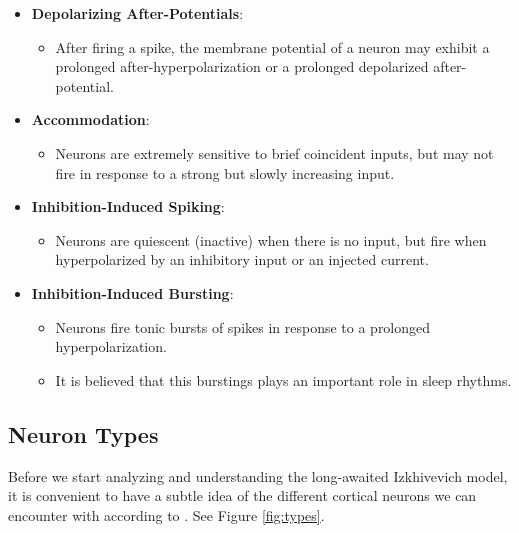 \documentclass{article} %
\begin{document}
\begin{itemize}
    \item \textbf{Depolarizing After-Potentials}:
    \begin{itemize}
        \item After firing a spike, the membrane potential of a neuron may exhibit a prolonged after-hyperpolarization or a prolonged depolarized after-potential.
    \end{itemize}
    
    \item \textbf{Accommodation}:
    \begin{itemize}
        \item Neurons are extremely sensitive to brief coincident inputs, but may not fire in response to a strong but slowly increasing input.
    \end{itemize}
    
    \item \textbf{Inhibition-Induced Spiking}:
    \begin{itemize} 
        \item Neurons are quiescent (inactive) when there is no input, but fire when hyperpolarized by an inhibitory input or an injected current.
    \end{itemize}
    
    \item \textbf{Inhibition-Induced Bursting}:
    \begin{itemize}
        \item Neurons fire tonic bursts of spikes in response to a prolonged hyperpolarization.
        \item It is believed that this burstings plays an important role in sleep rhythms.
    \end{itemize}
    
\end{itemize}


\subsection{Neuron Types}

Before we start analyzing and understanding the long-awaited Izkhivevich model, it is convenient to have a subtle idea of the different cortical neurons we can encounter with according to \cite{Izhikevich2003Simple}. See Figure \ref{fig:types}.
\end{document}
